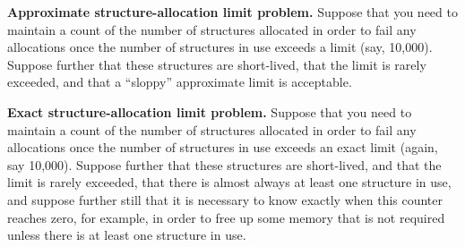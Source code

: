 \QuickQuizLabel{\QcountQstatcnt}

\QuickQuiz{}
	{ \bfseries Approximate structure-allocation limit problem. }
	Suppose that you need to maintain a count of the number of
	structures allocated in order to fail any allocations
	once the number of structures in use exceeds a limit
	(say, 10,000).
	Suppose further that these structures are short-lived,
	that the limit is rarely exceeded, and that a ``sloppy''
	approximate limit is acceptable.
 \QuickQuizEnd

\QuickQuizLabel{\QcountQapproxcnt}

\QuickQuiz{}
	{ \bfseries Exact structure-allocation limit problem. }
	Suppose that you need to maintain a count of the number of
	structures allocated in order to fail any allocations
	once the number of structures in use exceeds an exact limit
	(again, say 10,000).
	Suppose further that these structures are short-lived,
	and that the limit is rarely exceeded, that there is almost
	always at least one structure in use, and suppose further
	still that it is necessary to know exactly when this counter reaches
	zero, for example, in order to free up some memory
	that is not required unless there is at least one structure
	in use.
 \QuickQuizEnd

\QuickQuizLabel{\QcountQexactcnt}

